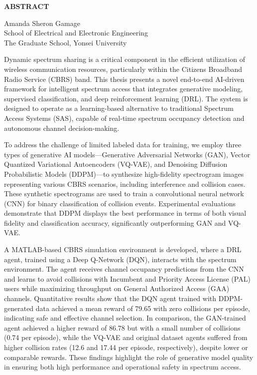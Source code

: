 \clearpage
\begin{centering}
\textbf{ABSTRACT}\\
\vspace{\baselineskip}
\end{centering}

\begin{flushright}
     Amanda Sheron Gamage \\
    School of Electrical and Electronic Engineering \\
    The Graduate School, Yonsei University
\end{flushright}

Dynamic spectrum sharing is a critical component in the efficient utilization of wireless communication resources, particularly within the Citizens Broadband Radio Service (CBRS) band. This thesis presents a novel end-to-end AI-driven framework for intelligent spectrum access that integrates generative modeling, supervised classification, and deep reinforcement learning (DRL). The system is designed to operate as a learning-based alternative to traditional Spectrum Access Systems (SAS), capable of real-time spectrum occupancy detection and autonomous channel decision-making.

To address the challenge of limited labeled data for training, we employ three types of generative AI models—Generative Adversarial Networks (GAN), Vector Quantized Variational Autoencoders (VQ-VAE), and Denoising Diffusion Probabilistic Models (DDPM)—to synthesize high-fidelity spectrogram images representing various CBRS scenarios, including interference and collision cases. These synthetic spectrograms are used to train a convolutional neural network (CNN) for binary classification of collision events. Experimental evaluations demonstrate that DDPM displays the best performance in terms of both visual fidelity and classification accuracy, significantly outperforming GAN and VQ-VAE.

A MATLAB-based CBRS simulation environment is developed, where a DRL agent, trained using a Deep Q-Network (DQN), interacts with the spectrum environment. The agent receives channel occupancy predictions from the CNN and learns to avoid collisions with Incumbent and Priority Access License (PAL) users while maximizing throughput on General Authorized Access (GAA) channels. Quantitative results show that the DQN agent trained with DDPM-generated data achieved a mean reward of 79.65 with zero collisions per episode, indicating safe and effective channel selection. In comparison, the GAN-trained agent achieved a higher reward of 86.78 but with a small number of collisions (0.74 per episode), while the VQ-VAE and original dataset agents suffered from higher collision rates (12.6 and 17.44 per episode, respectively), despite lower or comparable rewards. These findings highlight the role of generative model quality in ensuring both high performance and operational safety in spectrum access.

